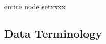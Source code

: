 \begin{namelist}{entire node setxxxx}
%

%
%
%
%
%

\end{namelist}


\subsection{Data Terminology}

